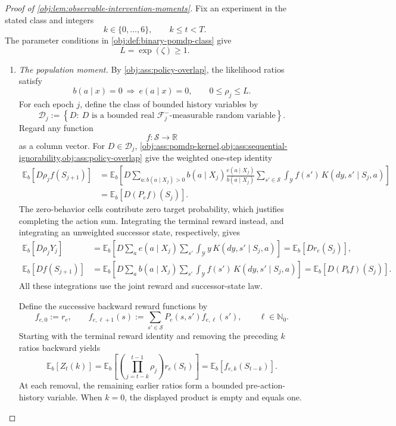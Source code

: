 \begin{proof}[Proof of \cref{obj:lem:observable-intervention-moments}]
Fix an experiment in the stated class and integers
\[
k\in\{0,\ldots,6\},\qquad k\le t<T.
\]
The parameter conditions in \cref{obj:def:binary-pomdp-class} give
\[
L=\exp(\zeta)\ge1.
\]

\begin{enumerate}
\item \emph{The population moment.}
By \cref{obj:ass:policy-overlap}, the likelihood ratios satisfy
\[
b(a\mid x)=0\ \Longrightarrow\ e(a\mid x)=0,
\qquad
0\le\rho_j\le L.
\]
For each epoch \(j\), define the class of bounded history variables by
\[
\mathcal D_j
:=
\left\{
D:\ D\text{ is a bounded real }
\mathcal F_j^-\text{-measurable random variable}
\right\}.
\]
Regard any function
\[
f:\mathcal S\longrightarrow\mathbb R
\]
as a column vector. For \(D\in\mathcal D_j\),
\cref{obj:ass:pomdp-kernel,obj:ass:sequential-ignorability,obj:ass:policy-overlap}
give the weighted one-step identity
\[
\begin{aligned}
\mathbb E_b[D\rho_j f(S_{j+1})]
&=
\mathbb E_b\!\left[
D\sum_{a:b(a\mid X_j)>0}
b(a\mid X_j)\frac{e(a\mid X_j)}{b(a\mid X_j)}
\sum_{s'\in\mathcal S}\int_{\mathcal Y}
f(s')\,K(dy,s'\mid S_j,a)
\right]\\
&=
\mathbb E_b[D(P_ef)(S_j)].
\end{aligned}
\]
The zero-behavior cells contribute zero target probability, which justifies completing the action sum. Integrating the terminal reward instead, and integrating an unweighted successor state, respectively, gives
\[
\begin{aligned}
\mathbb E_b[D\rho_jY_j]
&=
\mathbb E_b\!\left[
D\sum_a e(a\mid X_j)
\sum_{s'}\int_{\mathcal Y}y\,K(dy,s'\mid S_j,a)
\right]
=\mathbb E_b[Dr_e(S_j)],\\
\mathbb E_b[Df(S_{j+1})]
&=
\mathbb E_b\!\left[
D\sum_a b(a\mid X_j)
\sum_{s'}\int_{\mathcal Y}f(s')\,K(dy,s'\mid S_j,a)
\right]
=\mathbb E_b[D(P_bf)(S_j)].
\end{aligned}
\]
All these integrations use the joint reward and successor-state law.

Define the successive backward reward functions by
\[
f_{e,0}:=r_e,\qquad
f_{e,\ell+1}(s):=\sum_{s'\in\mathcal S}P_e(s,s')f_{e,\ell}(s'),
\qquad \ell\in\mathbb N_0.
\]
Starting with the terminal reward identity and removing the preceding \(k\) ratios backward yields
\[
\mathbb E_b[Z_t(k)]
=
\mathbb E_b\!\left[
\left(\prod_{j=t-k}^{t-1}\rho_j\right)r_e(S_t)
\right]
=
\mathbb E_b[f_{e,k}(S_{t-k})].
\]
At each removal, the remaining earlier ratios form a bounded pre-action-history variable. When \(k=0\), the displayed product is empty and equals one.


\end{enumerate}
\end{proof}
